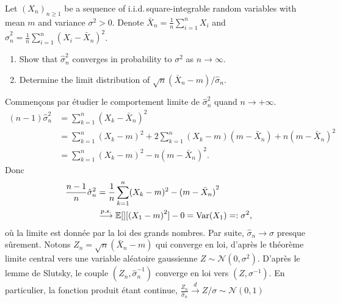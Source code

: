 \begin{Exercise}
  Let ${\left(X_{n}\right)}_{n \geq 1}$ be a sequence of i.i.d.\,square-integrable random variables with mean $m$ and variance $\sigma^{2}>0$. Denote $\bar{X}_{n}=\frac{1}{n} \sum_{i=1}^{n} X_{i}$ and $\hat{\sigma}_{n}^{2}=\frac{1}{n} \sum_{i=1}^{n}{\left(X_{i}-\bar{X}_{n}\right)}^{2}$.

  \begin{enumerate}
    \item Show that $\hat{\sigma}_{n}^{2}$ converges in probability to $\sigma^{2}$ as $n
            \rightarrow \infty$.

    \item Determine the limit distribution of $\sqrt{n}\left(\bar{X}_{n}-m\right) /
            \hat{\sigma}_{n}$.

  \end{enumerate}
\end{Exercise}

\begin{solution}
  Commen\c cons par \'etudier le comportement limite de $\hat{\sigma}_n^2$ quand $n\to +\infty$.
  \begin{align*}
    (n-1)\hat{\sigma}_n^2
     & =\sum_{k=1}^n{(X_k-\bar X_n)}^2                                                  \\
     & = \sum_{k=1}^n{(X_k-m)}^2 + 2\sum_{k=1}^n(X_k-m)(m-\bar X_n) + n{(m-\bar X_n)}^2 \\
     & = \sum_{k=1}^n{(X_k-m)}^2 - n{(m-\bar X_n)}^2.
  \end{align*}
  Donc
  \begin{align*}
    \frac{n-1}{n}\hat{\sigma}_n^2 & = \frac{1}{n}\sum_{k=1}^n(X_k-m)^2 - {(m-\bar X_n)}^2                           \\
                                  & \overset{p.s.}{\longrightarrow}\mathbb{E}[][{(X_1-m)}^2]-0= \mathrm{Var}(X_1)=:
    \sigma^2,
  \end{align*}
  o\`u la limite est donn\'ee par la loi des grands nombres. Par suite, $\hat{\sigma}_n \to \sigma$ presque s\^urement. Notons $Z_n = \sqrt{n}(\bar X_n-m)$ qui converge en loi, d'apr\`es le th\'eor\`eme limite central vers une variable al\'eatoire gaussienne $Z\sim \mathcal{N}(0,\sigma^2)$. D'apr\`es le lemme de Slutsky, le couple $(Z_n,\hat{\sigma}_n^{-1})$ converge en loi vers $(Z,\sigma^{-1})$. En particulier, la fonction produit \'etant continue, $\frac{Z_n}{\hat{\sigma}_n} \overset{d}{\rightarrow} Z/\sigma \sim \mathcal{N}(0,1)$
\end{solution}

